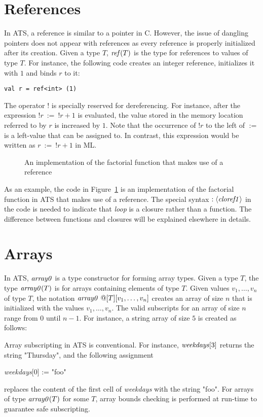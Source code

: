 \section{References}
In ATS, a reference is similar to a pointer in C. However, the issue of
dangling pointers does not appear with references as every reference is
properly initialized after its creation.  Given a type $T$, ${\it ref}(T)$ is
the type for references to values of type $T$. For instance, the following
code creates an integer reference, initializes it with $1$ and binds $r$ to
it:
\begin{verbatim}
val r = ref<int> (1)
\end{verbatim}
The operator $!$ is specially reserved for dereferencing.  For
instance, after the expression $!r~:=~!r + 1$ is evaluated, the value
stored in the memory location referred to by $r$ is increased by $1$. Note
that the occurrence of $!r$ to the left of $:=$ is a left-value that can be
assigned to.  In contrast, this expression would be written as $r~:=~!r +
1$ in ML.
\begin{figure}[thp]

\caption{An implementation of the factorial function that makes use of a reference}
\label{figure:ref_factorial}
\end{figure}
As an example, the code in Figure~\ref{figure:ref_factorial} is an
implementation of the factorial function in ATS that makes use of a
reference. The special syntax $:\langle{\it cloref1}\rangle$ in the code is
needed to indicate that {\it loop} is a closure rather than a function.
The difference between functions and closures will be explained elsewhere
in details.

\section{Arrays}
In ATS, ${\it array0}$ is a type constructor for forming array types.  Given
a type $T$, the type ${\it array0}(T)$ is for arrays containing elements of
type $T$.  Given values $v_1,\ldots,v_n$ of type $T$, the notation ${\it
array0}~@[T][v_1,\ldots,v_n]$ creates an array of size $n$ that is
initialized with the values $v_1,\ldots,v_n$.  The valid subscripts for an
array of size $n$ range from $0$ until $n-1$. For instance, a string array
of size $5$ is created as follows:

Array subscripting in ATS is conventional. For instance, ${\it
weekdays}[3]$ returns the string "Thursday", and the following assignment
\begin{center}
{\it weekdays}[0] := "foo"
\end{center}
replaces the content of the first cell of {\it weekdays} with the string
"foo". For arrays of type ${\it array0}(T)$ for some $T$, array bounds
checking is performed at run-time to guarantee safe subscripting.

